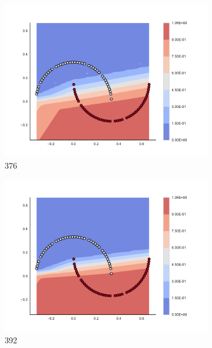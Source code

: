 \begin{figure}[h]
\begin{subfigure}[b]{0.09\textwidth}
    \includegraphics[clip, trim=2.35cm 1.75cm 4.5cm 0cm,width=\textwidth]{img/convergence/376.pdf}
    \caption{376}
    \label{fig:convergence_376}
\end{subfigure}
%
\begin{subfigure}[b]{0.09\textwidth}
    \includegraphics[clip, trim=2.35cm 1.75cm 4.5cm 0cm,width=\textwidth]{img/convergence/392.pdf}
    \caption{392}
    \label{fig:convergence_392}
\end{subfigure}
%
\begin{subfigure}[b]{0.09\textwidth}

\end{subfigure}
\end{figure}

